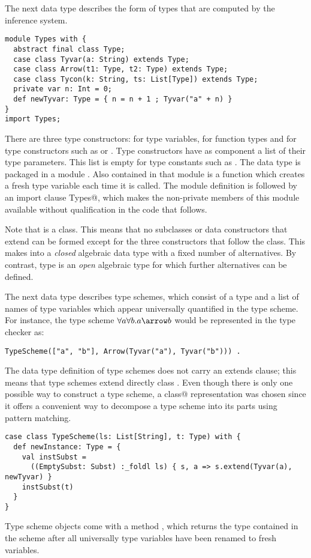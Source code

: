 \documentclass[11pt]{report}
\begin{document}
The next data type describes the form of types that are
computed by the inference system.
\begin{verbatim}
module Types with {
  abstract final class Type;
  case class Tyvar(a: String) extends Type;
  case class Arrow(t1: Type, t2: Type) extends Type;
  case class Tycon(k: String, ts: List[Type]) extends Type;
  private var n: Int = 0;
  def newTyvar: Type = { n = n + 1 ; Tyvar("a" + n) }
}
import Types;
\end{verbatim}
There are three type constructors: \verb@Tyvar@ for type variables,
\verb@Arrow@ for function types and \verb@Tycon@ for type
constructors such as \verb@Boolean@ or \verb@List@. Type constructors
have as component a list of their type parameters. This list is empty
for type constants such as \verb@Boolean@. The data type is packaged
in a module \verb@Types@. Also contained in that module is a function
\verb@newTyvar@ which creates a fresh type variable each time it is
called. The module definition is followed by an import clause
\verb@import Types@, which makes the non-private members of
this module available without qualification in the code that follows.

Note that \verb@Type@ is a \verb@final@ class. This means that no
subclasses or data constructors that extend \verb@Type@ can be formed
except for the three constructors that follow the class.  This makes
\verb@Type@ into a {\em closed} algebraic data type with a fixed
number of alternatives. By contrast, type \verb@Term@ is an {\em open}
algebraic type for which further alternatives can be defined.

The next data type describes type schemes, which consist of a type and
a list of names of type variables which appear universally quantified
in the type scheme. For instance, the type scheme $\forall a\forall
b.a \arrow b$ would be represented in the type checker as:
\begin{verbatim}
TypeScheme(["a", "b"], Arrow(Tyvar("a"), Tyvar("b"))) .
\end{verbatim}
The data type definition of type schemes does not carry an extends
clause; this means that type schemes extend directly class
\verb@Object@.
Even though there is only one possible way to construct a type scheme,
a \verb@case class@ representation was chosen since it offers a convenient
way to decompose a type scheme into its parts using pattern matching.
\begin{verbatim}
case class TypeScheme(ls: List[String], t: Type) with {
  def newInstance: Type = {
    val instSubst =
      ((EmptySubst: Subst) :_foldl ls) { s, a => s.extend(Tyvar(a), newTyvar) }
    instSubst(t)
  }
}
\end{verbatim}
Type scheme objects come with a method \verb@newInstance@, which
returns the type contained in the scheme after all universally type
variables have been renamed to fresh variables.
\end{document}

